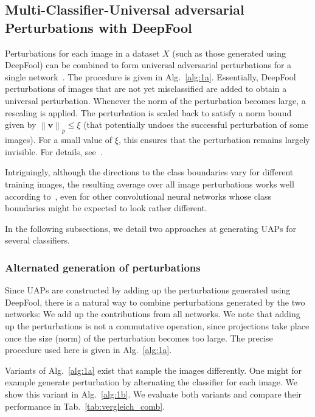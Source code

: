\documentclass[runningheads]{llncs}
\begin{document}
\subsection{Multi-Classifier-Universal adversarial Perturbations with DeepFool}\label{sec:MultUAP}

Perturbations for each image in a dataset \(X\) (such as those generated using DeepFool) can be combined to form universal adversarial perturbations for a single network~\cite{moosavidezfooli_universal_2017}. The procedure is given in Alg.~\ref{alg:1a}. Essentially, DeepFool perturbations of images that are not yet misclassified are added to obtain a universal perturbation. 
Whenever the norm of the perturbation becomes large, a rescaling is applied. The perturbation is scaled back to satisfy a norm bound given by \(\left\|\mathbf{v}\right\|_p\leq\xi\) (that potentially undoes the successful perturbation of some images). For a small value of \(\xi\), this ensures that the perturbation remains largely invisible. For details, see~\cite{moosavidezfooli_universal_2017}. 

Intriguingly, although the directions to the class boundaries vary for different training images, the resulting average over all image perturbations works well according to~\cite{moosavidezfooli_universal_2017}, even for other convolutional neural networks whose class boundaries might be expected to look rather different. 

In the following subsections, we detail two approaches at generating UAPs for several classifiers.

\subsubsection{Alternated generation of perturbations}
Since UAPs are constructed by adding up the perturbations generated using DeepFool, there is a natural way to combine perturbations generated by the two networks: We add up the contributions from all networks. We note that adding up the perturbations is not a commutative operation, since projections take place once the size (norm) of the perturbation becomes too large. The precise procedure used here is given in Alg.~\ref{alg:1a}. 

Variants of Alg.~\ref{alg:1a} exist that sample the images differently. One might for example generate perturbation by alternating the classifier for each image. We show this variant in Alg.~\ref{alg:1b}. We evaluate both variants and compare their performance in Tab.~\ref{tab:vergleich_comb}. 
 
\end{document}
